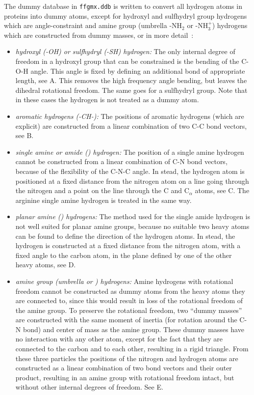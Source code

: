 The dummy database in \verb'ffgmx.ddb' is written to convert all
hydrogen atoms in proteins into dummy atoms, except for hydroxyl and
sulfhydryl group hydrogens which are angle-constraint and amine group
(umbrella -NH$_2$ or -NH$^+_3$) hydrogens which are constructed from
dummy masses, or in more detail~\cite{feenstra98}:
\begin{itemize}
\item{\em hydroxyl (-OH) or sulfhydryl (-SH)
hydrogen:\/} The only internal degree of freedom in a hydroxyl group
that can be constrained is the bending of the C-O-H
angle. This angle is fixed by defining an additional bond of
appropriate length, see A. This removes the high
frequency angle bending, but leaves the dihedral rotational
freedom. The same goes for a sulfhydryl group. Note that in these
cases the hydrogen is not treated as a dummy atom.
\item{\em aromatic hydrogens (-CH-):\/} The positions of
aromatic hydrogens (which are explicit) are constructed from a linear
combination of two C-C bond vectors, see B.
\item{\em single amine or amide ({\amines}) hydrogen:\/} The position
of a single amine hydrogen cannot be constructed from a linear
combination of C-N bond vectors, because of the flexibility of
the C-N-C angle. In stead, the hydrogen atom is positioned at
a fixed distance from the nitrogen atom on a line going through the
nitrogen and a point on the line through the C and C{$_\alpha$}
atoms, see C. The arginine single amine hydrogen is
treated in the same way.
\item{\em planar amine ({\amine}) hydrogens:\/} The method used for
the single amide hydrogen is not well suited for planar amine groups,
because no suitable two heavy atoms can be found to define the
direction of the hydrogen atoms. In stead, the hydrogen is constructed
at a fixed distance from the nitrogen atom, with a fixed angle to the
carbon atom, in the plane defined by one of the other heavy atoms, see
D.
\item{\em amine group (umbrella {\amine} or {\aminep}) hydrogens:\/}
Amine hydrogens with rotational freedom cannot be constructed as dummy
atoms from the heavy atoms they are connected to, since this would
result in loss of the rotational freedom of the amine group. To
preserve the rotational freedom, two ``dummy masses'' are constructed
with the same moment of inertia (for rotation around the C-N
bond) and center of mass as the amine group. These dummy masses have
no interaction with any other atom, except for the fact that they are
connected to the carbon and to each other, resulting in a rigid
triangle. From these three particles the positions of the nitrogen and
hydrogen atoms are constructed as a linear combination of two bond
vectors and their outer product, resulting in an amine group with
rotational freedom intact, but without other internal degrees of
freedom. See E.
\end{itemize}

